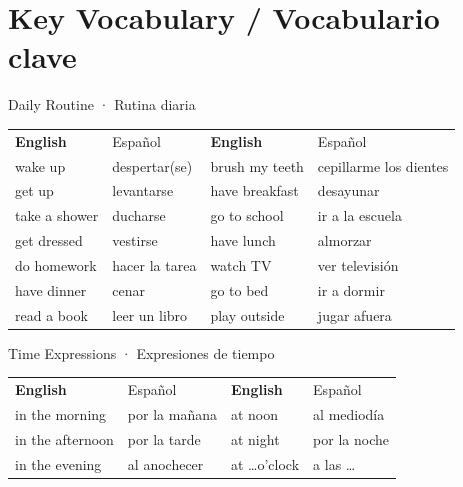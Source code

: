 
\section{Key Vocabulary / Vocabulario clave}

\begin{vocabcard}[colframe=kidsGreen, colbacktitle=kidsGreen]{Daily Routine · Rutina diaria}
\begin{center}
\begin{tabular}{ll@{\qquad}ll}
\bfseries\color{kidsGreen}English & \color{kidsGray}Español &
\bfseries\color{kidsGreen}English & \color{kidsGray}Español \\[4pt]
wake up        & despertar(se)    & brush my teeth & cepillarme los dientes \\
get up         & levantarse       & have breakfast & desayunar              \\
take a shower  & ducharse         & go to school   & ir a la escuela        \\
get dressed    & vestirse         & have lunch     & almorzar               \\
do homework    & hacer la tarea   & watch TV       & ver televisión         \\
have dinner    & cenar            & go to bed      & ir a dormir            \\
read a book    & leer un libro    & play outside   & jugar afuera           \\
\end{tabular}
\end{center}
\end{vocabcard}

\vspace{12pt}

\begin{grammartip}{Time Expressions · Expresiones de tiempo}
\begin{center}
\begin{tabular}{ll@{\quad}ll}
\bfseries\color{kidsOrange}English & \color{kidsGray}Español &
\bfseries\color{kidsOrange}English & \color{kidsGray}Español \\[4pt]
in the morning   & por la mañana   & at noon         & al mediodía  \\
in the afternoon & por la tarde    & at night        & por la noche \\
in the evening   & al anochecer    & at \ldots o'clock & a las \ldots \\
\end{tabular}
\end{center}
\end{grammartip}

